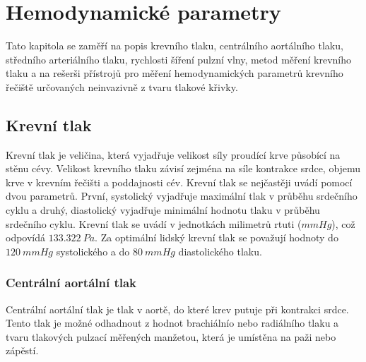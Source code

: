 \chapter{Hemodynamické parametry}
Tato kapitola se zaměří na popis krevního tlaku, centrálního aortálního tlaku, středního arteriálního tlaku, rychlosti šíření pulzní vlny, metod měření krevního tlaku a na rešerši přístrojů pro měření hemodynamických parametrů krevního řečiště určovaných neinvazivně z tvaru tlakové křivky.
\section{Krevní tlak}
Krevní tlak je veličina, která vyjadřuje velikost síly proudící krve působící na stěnu cévy. Velikost krevního tlaku závisí zejména na síle kontrakce srdce, objemu krve v krevním řečišti a
poddajnosti cév. Krevní tlak se nejčastěji uvádí pomocí dvou parametrů. První, systolický vyjadřuje maximální tlak v průběhu srdečního cyklu
a druhý, diastolický vyjadřuje minimální hodnotu tlaku v průběhu srdečního cyklu. Krevní tlak se uvádí v jednotkách milimetrů rtuti ($mmHg$), což odpovídá $133.322 \ Pa$. Za optimální lidský krevní tlak se považují hodnoty do $120 \ mmHg$ systolického a do $80 \ mmHg$ diastolického tlaku.
\cite{cite:BP}

\subsection{Centrální aortální tlak}
Centrální aortální tlak je tlak v aortě, do které krev putuje při kontrakci srdce.
Tento tlak je možné odhadnout z hodnot brachiálnío nebo radiálního tlaku a tvaru tlakových pulzací měřených manžetou, která je umístěna na paži nebo zápěstí.\cite{cite:CBP}

